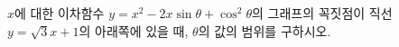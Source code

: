 $x$에 대한 이차함수 $y=x^2-2x\sin\theta+\cos^2\theta$의 그래프의 꼭짓점이 직선 $y=\sqrt{3}x+1$의 아래쪽에 있을 때, $\theta$의 값의 범위를 구하시오. \cond{$\pi\le\theta<2\pi$}
